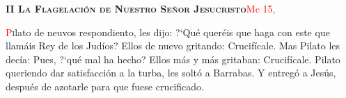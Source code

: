 \noindent\textbf{\textsc{II La Flagelación de Nuestro Señor Jesucristo}}\hfill\textcolor{red}{Mc 15, }

\vspace{0.25em}

\lettrine[lines=2]{\textcolor{red}{P}}ilato de neuvos respondiento, les dijo: {?`}Qué queréis que haga con este que llamáis Rey de los Judíos? Ellos de nuevo gritando: Crucifícale. Mas Pilato les decía: Pues, {?`}qué
mal ha hecho? Ellos más y más gritaban: Crucifícale. Pilato queriendo dar satisfacción a la turba, les soltó a Barrabas. Y entregó a Jesús, después de azotarle para que fuese crucificado.